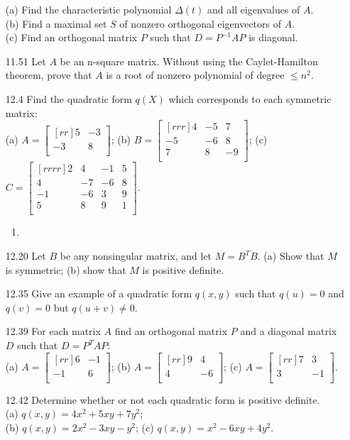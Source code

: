 \documentclass[12pt]{article}
\theoremstyle{definition}
\theoremstyle{plain}
\begin{document}
\begin{enumerate}
(a) Find the characteristic polynomial $\Delta(t)$ and all eigenvalues of $A$.\\
(b) Find a maximal set $S$ of nonzero orthogonal eigenvectors of $A$.\\
(c) Find an orthogonal matrix $P$ such that $D=P^{-1}AP$ is diagonal.
\item[11.51]Let $A$ be an n-square matrix. Without using the Caylet-Hamilton theorem, prove that $A$ is a root of nonzero polynomial of degree $\leq n^2$.
\item[12.4]Find the quadratic form $q(X)$ which corresponds to each symmetric matrix:\\
(a) $A=\begin{bmatrix}[rr]5&-3\\-3&8\\\end{bmatrix}$; (b) $B=\begin{bmatrix}[rrr]4&-5&7\\-5&-6&8\\7&8&-9\\\end{bmatrix}$; (c) $C=\begin{bmatrix}[rrrr]2&4&-1&5\\4&-7&-6&8\\-1&-6&3&9\\5&8&9&1\\\end{bmatrix}$.
	\begin{enumerate}
	\item
	\end{enumerate}
\item[12.20]Let $B$ be any nonsingular matrix, and let $M=B^TB$. (a) Show that $M$ is symmetric; (b) show that $M$ is positive definite.
\item[12.35]Give an example of a quadratic form $q(x,y)$ such that $q(u)=0$ and $q(v)=0$ but $q(u+v)\neq 0$.
\item[12.39]For each matrix $A$ find an orthogonal matrix $P$ and a diagonal matrix $D$ such that $D=P^TAP$:\\
(a) $A=\begin{bmatrix}[rr]6&-1\\-1&6\\\end{bmatrix}$; (b) $A=\begin{bmatrix}[rr]9&4\\4&-6\\\end{bmatrix}$; (c) $A=\begin{bmatrix}[rr]7&3\\3&-1\\\end{bmatrix}$.
\item[12.42]Determine whether or not each quadratic form is positive definite.\\
(a) $q(x,y) = 4x^2+5xy+7y^2$;\\
(b) $q(x,y)=2x^2-3xy-y^2$; (c) $q(x,y)=x^2-6xy+4y^2$.
\end{enumerate}
\end{document}
